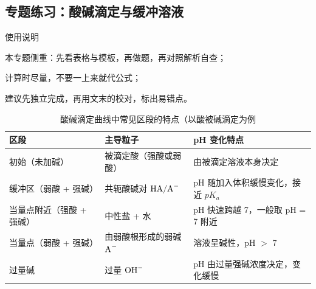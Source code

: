 \documentclass[a4paper,11pt]{ctexart}
\begin{document}
\clearpage

\subsection{专题练习：酸碱滴定与缓冲溶液}

\begin{summarybox}{使用说明}
  \begin{focuspoints}
    \item 本专题侧重：先看表格与模板，再做题，再对照解析自查；
    \item 计算时尽量，不要一上来就代公式；
    \item 建议先独立完成，再用文末的校对，标出易错点。
  \end{focuspoints}
\end{summarybox}

\begin{table}[htbp]
  \centering
  \caption{酸碱滴定曲线中常见区段的特点（以酸被碱滴定为例}
  \begin{tabularx}{0.96\textwidth}{>{\raggedright\arraybackslash}p{3.2cm} X X}
    \toprule
    区段 & 主导粒子 & pH 变化特点 \\
    \midrule
    初始（未加碱） & 被滴定酸（强酸或弱酸） & 由被滴定溶液本身决定 \\
    缓冲区（弱酸 + 强碱） & 共轭酸碱对 $\ce{HA/A^-}$ & pH 随加入体积缓慢变化，接近 $pK_a$ \\
    当量点附近（强酸 + 强碱） & 中性盐 + 水 & pH 快速跨越 7，一般取 pH = 7 附近 \\
    当量点（弱酸 + 强碱） & 由弱酸根形成的弱碱 $\ce{A^-}$ & 溶液呈碱性，pH $>$ 7 \\
    过量碱 & 过量 $\ce{OH^-}$ & pH 由过量强碱浓度决定，变化缓慢 \\
    \bottomrule
  \end{tabularx}
\end{table}
\end{document}
